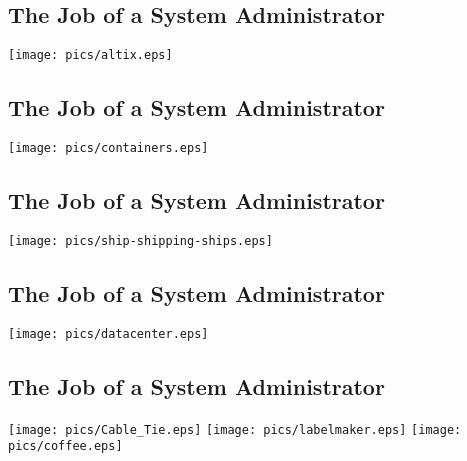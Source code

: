 \documentclass[xga]{xdvislides}
\begin{document}
\subsection{The Job of a System Administrator}
\vspace*{\fill}
\begin{center}
	\texttt{[image: pics/altix.eps]} \\
\end{center}
\vspace*{\fill}

\subsection{The Job of a System Administrator}
\vspace*{\fill}
\begin{center}
	\texttt{[image: pics/containers.eps]} \\
\end{center}
\vspace*{\fill}

\subsection{The Job of a System Administrator}
\vspace*{\fill}
\begin{center}
	\texttt{[image: pics/ship-shipping-ships.eps]} \\
\end{center}
\vspace*{\fill}


\subsection{The Job of a System Administrator}
\vspace*{\fill}
\begin{center}
	\texttt{[image: pics/datacenter.eps]} \\
\end{center}
\vspace*{\fill}

\subsection{The Job of a System Administrator}
\vspace*{\fill}
\begin{center}
	\texttt{[image: pics/Cable\_Tie.eps]}
	\texttt{[image: pics/labelmaker.eps]}
	\texttt{[image: pics/coffee.eps]} \\
\end{center}
\vspace*{\fill}
\end{document}
